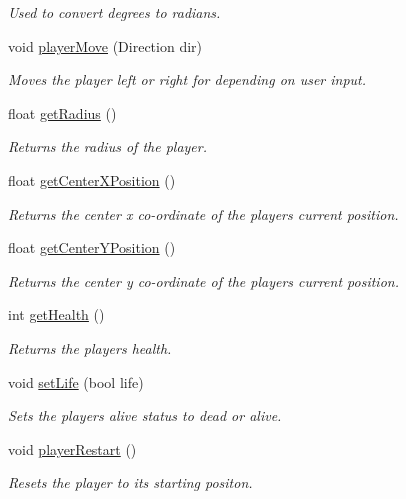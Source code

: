 \begin{DoxyCompactItemize}
\begin{DoxyCompactList}\small\item\em Used to convert degrees to radians. \end{DoxyCompactList}\item 
void \hyperlink{class_player_logic_a2b63d2c01e898e5798c2801466c8b432}{player\+Move} (Direction dir)
\begin{DoxyCompactList}\small\item\em Moves the player left or right for depending on user input. \end{DoxyCompactList}\item 
float \hyperlink{class_player_logic_a2ca2c54d1e07bfc40a08b5c55403af3a}{get\+Radius} ()
\begin{DoxyCompactList}\small\item\em Returns the radius of the player. \end{DoxyCompactList}\item 
float \hyperlink{class_player_logic_a6bdec8d007701c16a3cbb87e7fdfe0e6}{get\+Center\+X\+Position} ()
\begin{DoxyCompactList}\small\item\em Returns the center x co-\/ordinate of the player\textquotesingle{}s current position. \end{DoxyCompactList}\item 
float \hyperlink{class_player_logic_ad7b9048aee0c7b58443055f37f871537}{get\+Center\+Y\+Position} ()
\begin{DoxyCompactList}\small\item\em Returns the center y co-\/ordinate of the player\textquotesingle{}s current position. \end{DoxyCompactList}\item 
int \hyperlink{class_player_logic_aa13b870627a1d38cd1c633ac8012e5af}{get\+Health} ()
\begin{DoxyCompactList}\small\item\em Returns the players health. \end{DoxyCompactList}\item 
void \hyperlink{class_player_logic_a3139e107a0eb76e7307f8657818b3007}{set\+Life} (bool life)
\begin{DoxyCompactList}\small\item\em Sets the players alive status to dead or alive. \end{DoxyCompactList}\item 
\mbox{\label{class_player_logic_aaaf0e8356e5af9753015960be7727724}} 
void \hyperlink{class_player_logic_aaaf0e8356e5af9753015960be7727724}{player\+Restart} ()
\begin{DoxyCompactList}\small\item\em Resets the player to its starting positon. \end{DoxyCompactList}\end{DoxyCompactItemize}


